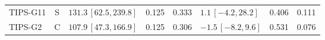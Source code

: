 \documentclass[10pt,a4paper]{article}
\begin{document}
\begin{longtable}{lcp{37mm}rrp{37mm}rr}
TIPS-G11 & S & \(131.3\,[62.5,239.8]\) & 0.125 & 0.333 & \(1.1\,[-4.2,28.2]\) & 0.406 & 0.111\\
TIPS-G2 & C & \(107.9\,[47.3,166.9]\) & 0.125 & 0.306 & \(-1.5\,[-8.2,9.6]\) & 0.531 & 0.076\\

\end{longtable}
\end{document}

